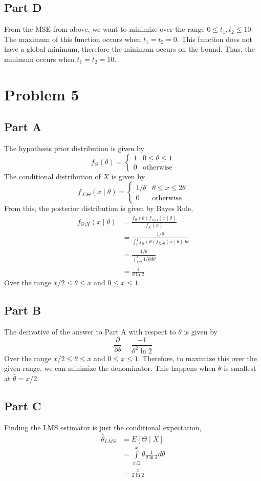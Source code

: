 \documentclass{article}
\begin{document}
\subsection*{Part D}

From the MSE from above, we want to minimize over the range $0 \leq t_1, t_2
\leq 10$. The maximum of this function occurs when $t_1 = t_2 = 0$. This
function does not have a global minimum, therefore the minimum occurs on the
bound. Thus, the minimum occurs when $ t_1 = t_2 = 10$.

\section*{Problem 5}

\subsection*{Part A}

The hypothesis prior distribution is given by
$$ f_\Theta(\theta) = \begin{cases}
  1 & 0 \leq \theta \leq 1 \\
  0 & \mathrm{otherwise}
\end{cases} $$
The conditional distribution of $X$ is given by
$$ f_{X|\Theta}(x \mid \theta) = \begin{cases}
  1 / \theta & \theta \leq x \leq 2 \theta \\
  0 & \mathrm{otherwise}
\end{cases} $$
From this, the posterior distribution is given by Bayes Rule,
\begin{align*}
  f_{\Theta|X}(x \mid \theta) &= \frac{f_\Theta(\theta) f_{X|\Theta}(x \mid
  \theta)}{f_X(x)} \\
  &= \frac{1 / \theta}{\int_0^1 f_\Theta(\theta) f_{X|\Theta}(x \mid \theta)
  d\theta} \\
  &= \frac{1 / \theta}{\int_{x/2}^{x} 1 / \theta d\theta} \\
  &= \frac{1}{\theta \ln 2}
\end{align*}
Over the range $x/2 \leq \theta \leq x$ and $0 \leq x \leq 1$.

\subsection*{Part B}

The derivative of the answer to Part A with respect to $\theta$ is given by
$$ \frac{\partial}{\partial \theta} = \frac{-1}{\theta^2 \ln 2} $$
Over the range $x/2 \leq \theta \leq x$ and $0 \leq x \leq 1$. Therefore, to
maximize this over the given range, we can minimize the denominator. This
happens when $\theta$ is smallest at $\hat{\theta} = x/2$.

\subsection*{Part C}

Finding the LMS estimator is just the conditional expectation,
\begin{align*}
  \hat{\theta}_{LMS} &= E[\Theta \mid X] \\
  &= \int\limits_{x/2}^{x} \theta \frac{1}{\theta \ln 2} d\theta \\
  &= \frac{x}{2 \ln 2}
\end{align*}
\end{document}
